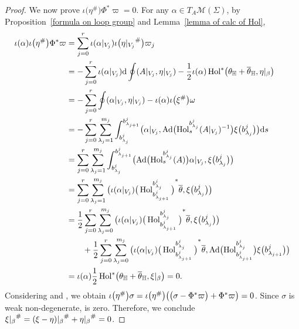 \documentclass[10pt,a4paper]{amsart}
\numberwithin{equation}{section}
\theoremstyle{definition}
\newcommand{\Ad}{\operatorname{Ad}}
\newcommand{\Hol}{\operatorname{Hol}}
\newcommand{\bH}{\mathbb{H}}
\begin{document}
\begin{proof}
We now prove $\iota\bigl(\eta^{\#}\bigr)\Phi^*\varpi=0$.
 For any $\alpha \in T_A \mathcal{M}(\Sigma)$, by Proposition~\ref{formula on loop group} and Lemma~\ref{lemma of calc of Hol},
 \begin{align*}
 \iota(\alpha)\iota\bigl(\eta^{\#}\bigr) \Phi^*\varpi &= \sum_{j=0}^{r} \iota(\alpha|_{V_j}) \iota\bigl({\eta|_{V_j}}^{\#}\bigr) \varpi_j\\
 &=-\sum_{j=0}^{r} \iota(\alpha|_{V_j}) {\rm d} \oint (A|_{V_j}, \eta|_{V_j}) - \frac{1}{2} \iota(\alpha)\Hol^*\bigl(\theta_{\bH}+ \overline{\theta}_{\bH}, \eta|_{\beta}\bigr) \\
 &=-\sum_{j=0}^{r} \oint (\alpha|_{V_j}, \eta|_{V_j}) - \iota(\alpha) \iota\bigl(\xi^{\#}\bigr) \omega\\
 &= -\sum_{j=0}^{r} \sum_{\lambda_j = 1}^{m_j} \int_{b^j_{\lambda_j}}^{b^j_{\lambda_{j+1}}} \bigl(\alpha|_{V_j}, \Ad\bigl(\Hol^{b^j_{\lambda_{j}}}_{s}(A|_{V_j})^{-1}\bigr)\xi\bigl(b^j_{\lambda_j}\bigr)\bigr){\rm d} s\\
 &=\sum_{j=0}^{r} \sum_{\lambda_j =1}^{m_j} \int _{b^j_{\lambda_j}}^{b^j_{\lambda_{j+1}}} \bigl(\Ad\bigl(\Hol^{b^j_{\lambda_j}}_{s}(A)\bigr)\alpha|_{V_j}, \xi\bigl(b^j_{\lambda_j}\bigr)\bigr) \\
 &= \sum_{j=0}^{r} \sum_{\lambda_j =1}^{m_j} \big( \iota(\alpha|_{V_j}){\big(\Hol^{b^j_{\lambda_j}}_{b^j_{\lambda_{j+1}}}\big)}^*\overline{\theta}, \xi\bigl(b^j_{\lambda_j}\bigr)\big) \\
 &= \frac{1}{2} \sum_{j=0}^{r} \sum_{\lambda_j=0}^{m_j} \big( \iota(\alpha|_{V_j}){\big(\Hol^{b^j_{\lambda_j}}_{b^j_{\lambda_{j+1}}}\big)}^*\overline{\theta}, \xi\bigl(b^j_{\lambda_j}\bigr) \big)\\
 & \qquad + \frac{1}{2} \sum_{j=0}^{r} \sum_{\lambda_j=0}^{m_j} \big( \iota(\alpha|_{V_j}){\big(\Hol^{b^j_{\lambda_j}}_{b^j_{\lambda_{j+1}}}\big)}^*\overline{\theta}, \Ad\bigl(\Hol^{b^j_{\lambda_j}}_{b^j_{\lambda_{j+1}}}\bigr)\xi\bigl(b^j_{\lambda_{j+1}}\bigr) \big) \\
 &= \iota(\alpha) \frac{1}{2} \Hol^*\bigl(\theta_{\bH}+ \overline{\theta}_{\bH}, \xi|_{\beta}\bigr) =0.
 \end{align*}
 Considering  and \smash{$\eta^{\#} \in \ker\bigl(\sigma- \Phi^*\varpi\bigr)$}, we obtain $\smash{\iota\bigl(\eta^{\#}\bigr)\sigma= \iota\bigl(\eta^{\#}\bigr)}\bigl(\bigl(\sigma - \Phi^*\varpi\bigr)+\smash{\Phi^*\varpi}\bigr) =0$.
 Since $\sigma$ is weak non-degenerate, \smash{$\eta^{\#}$} is zero.
 Therefore, we conclude $\smash{{\xi|_{\beta}}^{\#} }= \smash{{(\xi-\eta)|_{\beta}}^{\#} + {\eta|_{\beta}}^{\#}}=0$.
\end{proof}
\end{document}

